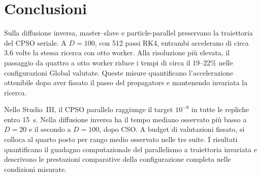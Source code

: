 \section{Conclusioni}\label{sec:conclusions}

Sulla diffusione inversa, master--slave e particle-parallel preservano la traiettoria del CPSO seriale. A $D=100$, con 512 passi RK4, entrambi accelerano di circa $3.6$ volte la stessa ricerca con otto worker. Alla risoluzione più elevata, il passaggio da quattro a otto worker riduce i tempi di circa il 19--22\% nelle configurazioni Global valutate. Queste misure quantificano l’accelerazione ottenibile dopo aver fissato il passo del propagatore e mantenendo invariata la ricerca.

Nello Studio~III, il CPSO parallelo raggiunge il target $10^{-8}$ in tutte le repliche entro 15~s. Nella diffusione inversa ha il tempo mediano osservato più basso a $D=20$ e il secondo a $D=100$, dopo CSO. A budget di valutazioni fissato, si colloca al quarto posto per rango medio osservato nelle tre suite. I risultati quantificano il guadagno computazionale del parallelismo a traiettoria invariata e descrivono le prestazioni comparative della configurazione completa nelle condizioni misurate.

